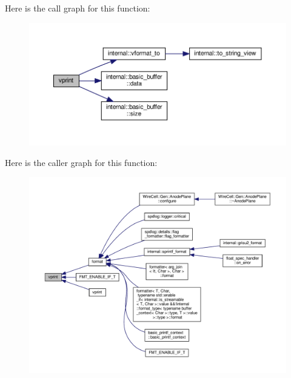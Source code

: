 Here is the call graph for this function\+:
\nopagebreak
\begin{figure}[H]
\begin{center}
\leavevmode
\includegraphics[width=350pt]{format-inl_8h_a9d834f6ef5c0553b6c434f8d9ac105bf_cgraph}
\end{center}
\end{figure}
Here is the caller graph for this function\+:
\nopagebreak
\begin{figure}[H]
\begin{center}
\leavevmode
\includegraphics[width=350pt]{format-inl_8h_a9d834f6ef5c0553b6c434f8d9ac105bf_icgraph}
\end{center}
\end{figure}
\mbox{\label{format-inl_8h_a263a1a720ae8f902535a6c7a4933841e}} 
